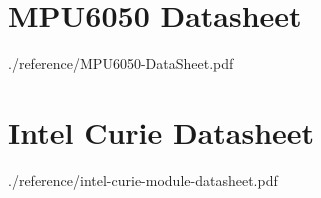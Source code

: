 \section*{\thesection\quad  MPU6050 Datasheet}

{./reference/MPU6050-DataSheet.pdf}

\newpage
{}\section*{\thesection\quad  Intel Curie Datasheet}

{./reference/intel-curie-module-datasheet.pdf}